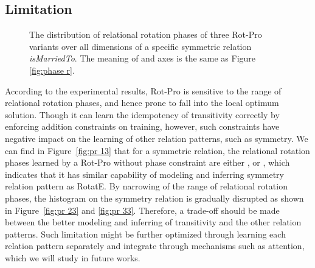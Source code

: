 \documentclass{article}
\begin{document}
\subsection{Limitation}
\begin{figure}
  \centering
{}
\caption{The distribution of relational rotation phases of three Rot-Pro variants over all dimensions of a specific symmetric relation \emph{isMarriedTo}. The meaning of  and  axes is the same as Figure \ref{fig:phase r}.
}
\label{fig:phase r2}
\end{figure}

According to the experimental results, Rot-Pro is sensitive to the range of relational rotation phases, and hence prone to fall into the local optimum solution.
Though it can learn the idempotency of transitivity correctly by enforcing addition constraints on training, however, such constraints have negative impact on the learning of other relation patterns, such as symmetry. We can find in Figure~\ref{fig:pr 13} that for a symmetric relation, the relational rotation phases learned by a Rot-Pro without phase constraint are either ,  or , which indicates that it has similar capability of modeling and inferring symmetry relation pattern as RotatE. By narrowing of the range of relational rotation phases, the histogram on the symmetry relation is gradually disrupted as shown in Figure~\ref{fig:pr 23} and \ref{fig:pr 33}.
Therefore, a trade-off should be made between the better modeling and inferring of transitivity and the  other relation patterns.
Such limitation might be further optimized through  learning each relation pattern separately and integrate through mechanisms such as attention, which we will study in future works.
\end{document}
